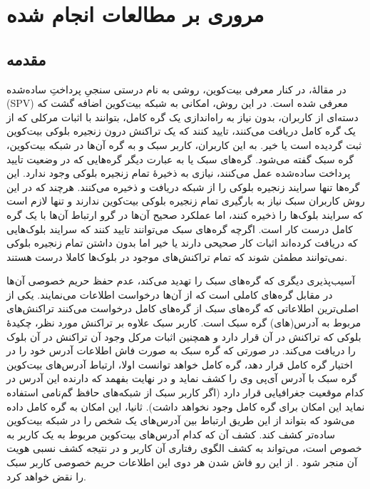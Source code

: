 \chapter{مروری بر مطالعات انجام شده}
\section{مقدمه}
در مقالهٔ\cite{Nakamoto2009}، در کنار معرفی بیت‌کوین، روشی به نام درستی سنجیِ پرداختِ ساده‌شده (SPV) معرفی شده است. در این روش، امکانی به شبکه بیت‌کوین اضافه گشت که دسته‌ای از کاربران، بدون نیاز به راه‌اندازی یک گره کامل، بتوانند با اثبات مرکلی که از یک گره کامل دریافت می‌کنند، تایید کنند که یک تراکنش درون زنجیره بلوکی بیت‌کوین ثبت گردیده‌ است یا خیر. به این کاربران، کاربر سبک و به گره آن‌ها در شبکه بیت‌کوین، گره سبک گفته می‌شود. گره‌های سبک یا به عبارت دیگر گره‌هایی که در وضعیت تایید پرداخت ساده‌شده عمل می‌کنند، نیازی به ذخیرهٔ تمام زنجیره بلوکی وجود ندارد. این گره‌ها تنها سرایند زنجیره بلوکی را از شبکه دریافت و ذخیره می‌کنند.  هرچند که در این روش کاربران سبک نیاز به بارگیری تمام زنجیره بلوکی بیت‌‌کوین ندارند و تنها لازم است که سرایند بلوک‌ها را ذخیره کنند،‌ اما عملکرد صحیح آن‌ها در گرو ارتباط آن‌ها با یک گره کامل درست کار است. اگرچه گره‌های سبک می‌توانند تایید کنند که سرایند بلوک‌هایی که دریافت کرده‌اند اثبات کار صحیحی دارند یا خیر اما بدون داشتن تمام زنجیره بلوکی نمی‌توانند مطمئن شوند که تمام تراکنش‌های موجود در بلوک‌ها کاملا درست هستند.

آسیب‌پذیری دیگری که گره‌های سبک را تهدید می‌کند، عدم حفظ حریم خصوصی آن‌ها در مقابل گره‌های کاملی است که از آن‌ها درخواست اطلاعات می‌نمایند. یکی از اصلی‌ترین اطلاعاتی که گره‌های سبک از گره‌های کامل درخواست می‌کنند تراکنش‌های مربوط به آدرس(های) گره سبک است. کاربر سبک علاوه بر تراکنش مورد نظر، چکیدهٔ بلوکی که تراکنش در آن قرار دارد و همچنین اثبات مرکل وجود آن تراکنش در آن بلوک را دریافت می‌کند. در صورتی که گره سبک به صورت فاش اطلاعات آدرس خود را در اختیار گره کامل قرار دهد، گره کامل خواهد توانست اولا، ارتباط آدرس‌های بیت‌کوین گره سبک با آدرس آی‌پی وی را کشف نماید و در نهایت بفهمد که دارنده این آدرس در کدام موقعیت جغرافیایی قرار دارد (اگر کاربر سبک از شبکه‌های حافظ گم‌نامی استفاده نماید این امکان برای گره کامل وجود نخواهد داشت). ثانیا، این امکان به گره کامل داده می‌شود که بتواند از این طریق ارتباط بین آدرس‌های یک شخص را در شبکه بیت‌کوین ساده‌تر کشف کند. کشف آن که کدام آدرس‌های بیت‌کوین مربوط به یک کاربر به خصوص است، می‌تواند به کشف الگوی رفتاری آن کاربر و در نتیجه کشف نسبی هویت آن منجر شود \cite{Ron2013}. از این رو فاش شدن هر دوی این اطلاعات حریم خصوصی کاربر سبک را نقض خواهد کرد.

